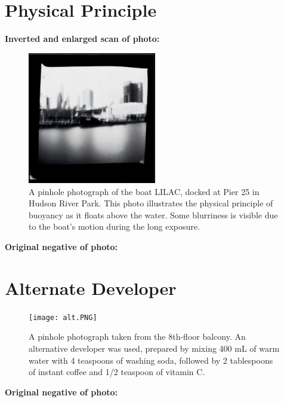 \documentclass[12pt]{article}
\begin{document}
\section*{Physical Principle}
\textbf{Inverted and enlarged scan of photo:}
\begin{figure}[H]
  \centering
  \includegraphics[width=0.5\textwidth]{boat.PNG}
  \caption{A pinhole photograph of the boat LILAC, docked at Pier 25 in Hudson River Park. This photo illustrates the physical principle of buoyancy as it floats above the water. Some blurriness is visible due to the boat’s motion during the long exposure.}
\end{figure}
\textbf{Original negative of photo:}
\newpage 
\section*{Alternate Developer}
\begin{figure}[H]
  \centering
  \texttt{[image: alt.PNG]}
  \caption{A pinhole photograph taken from the 8th-floor balcony. An alternative developer was used, prepared by mixing 400 mL of warm water with 4 teaspoons of washing soda, followed by 2 tablespoons of instant coffee and 1/2 teaspoon of vitamin C.}
\end{figure}
\textbf{Original negative of photo:}
\end{document}
